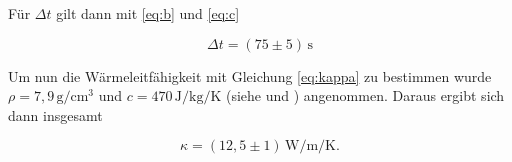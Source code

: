 \noindent Für $\Delta t$ gilt dann mit \ref{eq:b} und \ref{eq:c}

\begin{equation*}
  \Delta t=(75\pm5)\,\si{\second}
\end{equation*}

\noindent Um nun die Wärmeleitfähigkeit mit Gleichung \ref{eq:kappa} zu bestimmen wurde $\rho=7,9\,\si{\gram\per\centi\meter\tothe{3}}$ und $c=470\,\si{\joule\per\kilo\gram\per\kelvin}$ (siehe \cite{chemieTabelle} und \cite{chemieDichte}) angenommen.
Daraus ergibt sich dann insgesamt

\begin{equation*}
  \kappa=(12,5\pm1)\,\si{\watt\per\meter\per\kelvin}.
\end{equation*}

